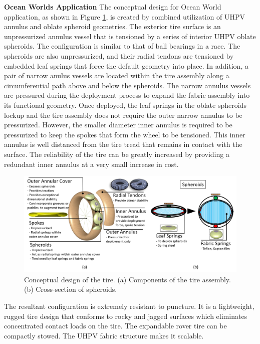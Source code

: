 \documentclass{article}
\begin{document}
\textbf{Ocean Worlds Application}
\newline
The conceptual design for Ocean World application, as shown in Figure \ref{fig:tire_design_original}, is created by combined utilization of UHPV annulus and oblate spheroid geometries. The exterior tire surface is an unpressurized annulus vessel that is tensioned by a series of interior UHPV oblate spheroids. The configuration is similar to that of ball bearings in a race. The spheroids are also unpressurized, and their radial tendons are tensioned by embedded leaf springs that force the default geometry into place. In addition, a pair of narrow anulus vessels are located within the tire assembly along a circumferential path above and below the spheroids. The narrow annulus vessels are pressured during the deployment process to expand the fabric assembly into its functional geometry. Once deployed, the leaf springs in the oblate spheroids lockup and the tire assembly does not require the outer narrow annulus to be pressurized. However, the smaller diameter inner annulus is required to be pressurized to keep the spokes that form the wheel to be tensioned. This inner annulus is well distanced from the tire tread that remains in contact with the surface. The reliability of the tire can be greatly increased by providing a redundant inner annulus at a very small increase in cost.

\begin{figure}[hbt!]
\centering
\includegraphics[width=1\textwidth]{general-images/tire_design_original.png}
\caption{Conceptual design of the tire. (a) Components of the tire assembly. (b) Cross-section of spheroids.}
\label{fig:tire_design_original}
\end{figure}

The resultant configuration is extremely resistant to puncture. It is a lightweight, rugged tire design that conforms to rocky and jagged surfaces which eliminates concentrated contact loads on the tire. The expandable rover tire can be compactly stowed. The UHPV fabric structure makes it scalable. 
\end{document}
